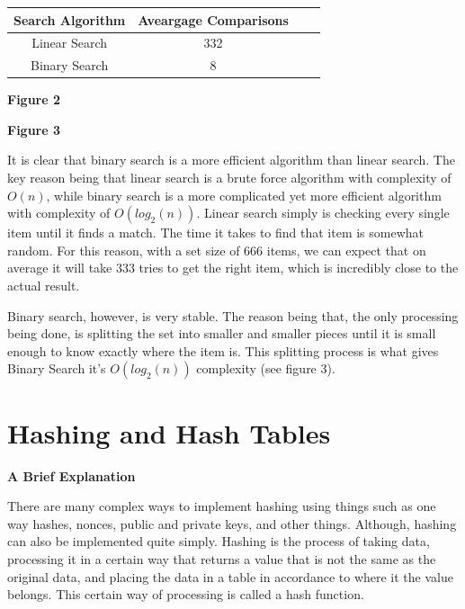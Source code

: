 \documentclass[letterpaper, 10pt]{article}
\begin{document}
\begin{center}
{
 \begin{tabular}{||c c c c||} 
 \hline
 Search Algorithm & Aveargage Comparisons \\ [0.5ex] 
 \hline\hline
 Linear Search& 332 \\ 
 \hline
 Binary Search& 8 \\
 \hline
\end{tabular}
}
\textbf{Figure 2}
\end{center}
\begin{center}
\textbf{Figure 3}
\end{center}




It is clear that binary search is a more efficient algorithm than linear search. The key reason being that linear search is a brute force algorithm with complexity of $O(n)$, while binary search is a more complicated yet more efficient algorithm with complexity of $O(log_2(n))$. Linear search simply is checking every single item until it finds a match. The time it takes to find that item is somewhat random. For this reason, with a set size of 666 items, we can expect that on average it will take 333 tries  to get the right item, which is incredibly close to the actual result.

Binary search, however, is very stable. The reason being that, the only processing being done, is splitting the set into smaller and smaller pieces until it is small enough to know exactly where the item is. This splitting process is what gives Binary Search it's $O(log_2(n))$ complexity (see figure 3). 

\section{Hashing and Hash Tables}
\begin{center}
\textbf{ A Brief Explanation}
\end{center}

There are many complex ways to implement hashing using things such as one way hashes, nonces, public and private keys, and other things. Although, hashing can also be implemented quite simply. Hashing is the process of taking data, processing it in a certain way that returns a value that is not the same as the original data, and placing the data in a table in accordance to where it the value belongs. This certain way of processing is called a hash function.
\end{document}
